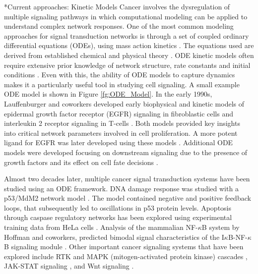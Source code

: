 \documentclass[12pt]{article}
\makeatletter
\renewcommand\section{\@startsection
	{subsection}{2}{0mm}
	{-0.2in}
	{0.05\baselineskip}
	{\normalfont\large\bfseries}}
\makeatother
\begin{document}
\section*{Current approaches: Kinetic Models}
Cancer involves the dysregulation of multiple signaling pathways in which computational modeling can be applied to understand complex network responses. One of the most common modeling approaches for signal transduction networks is through a set of coupled ordinary differential equations (ODEs), using mass action kinetics \cite{Aldridge2006}. The equations used are derived from established chemical and physical theory \cite{Aldridge2006}. ODE kinetic models often require extensive prior knowledge of network structure, rate constants and initial conditions \cite{Kholodenko2012}. Even with this, the ability of ODE models to capture dynamics makes it a particularly useful tool in studying cell signaling. A small example ODE model is shown in Figure \ref{fg:ODE_Model}. In the early 1990s, Lauffenburger and coworkers developed early biophysical and kinetic models of epidermal growth factor receptor (EGFR) signaling in fibroblastic cells and interleukin 2 receptor signaling in T-cells \cite{Starbuck1992, Forsten1994}. Both models provided key insights into critical network parameters involved in cell proliferation. A more potent ligand for EGFR was later developed using these models \cite{Reddy1996}. Additional ODE models were developed focusing on downstream signaling due to the presence of growth factors and its effect on cell fate decisions \cite{Kholodenko1999, Schoeberl2002}. 

Almost two decades later, multiple cancer signal transduction systems have been studied using an ODE framework. DNA damage response was studied with a p53/MdM2 network model \cite{Ciliberto2005}. The model contained negative and positive feedback loops, that subsequently led to oscillations in p53 protein levels. Apoptosis through caspase regulatory networks has been explored using experimental training data from HeLa cells \cite{Rehm2006,Albeck2008a,Albeck2008}. Analysis of the mammalian NF-$\kappa$B system by Hoffman and coworkers, predicted bimodal signal characteristics of the I$\kappa$B-NF-$\kappa$B signaling module \cite{Hoffmann2002}. Other important cancer signaling systems that have been explored include RTK and MAPK (mitogen-activated protein kinase) cascades \cite{Bhalla2002, Schoeberl2002,Borisov2009,Chen2009}, JAK-STAT signaling \cite{Swameye2003,Vera2008}, and Wnt signaling \cite{Leeuwen2007, Leeuwen2009,Kim2007}. 
\end{document}
